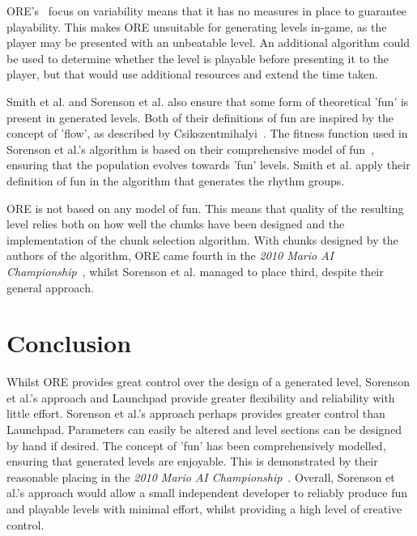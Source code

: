 \documentclass{scrartcl}
\begin{document}
ORE's~\cite{mawhorter:occupancy} focus on variability means that it has no measures in place to guarantee playability. This makes ORE unsuitable for generating levels in-game, as the player may be presented with an unbeatable level. An additional algorithm could be used to determine whether the level is playable before presenting it to the player, but that would use additional resources and extend the time taken.

Smith et al. and Sorenson et al. also ensure that some form of theoretical 'fun' is present in generated levels. Both of their definitions of fun are inspired by the concept of 'flow', as described by Csikszentmihalyi~\cite{csik:flow, smith:rhythm}. The fitness function used in Sorenson et al.'s algorithm is based on their comprehensive model of fun~\cite{sorenson:fun}, ensuring that the population evolves towards 'fun' levels. Smith et al. apply their definition of fun in the algorithm that generates the rhythm groups.

ORE is not based on any model of fun. This means that quality of the resulting level relies both on how well the chunks have been designed and the implementation of the chunk selection algorithm. With chunks designed by the authors of the algorithm, ORE came fourth in the \textit{2010 Mario AI Championship}~\cite{shaker:mario}, whilst Sorenson et al. managed to place third, despite their general approach.


\section{Conclusion}
Whilst ORE provides great control over the design of a generated level, Sorenson et al.'s approach and Launchpad provide greater flexibility and reliability with little effort. Sorenson et al.'s approach perhaps provides greater control than Launchpad. Parameters can easily be altered and level sections can be designed by hand if desired. The concept of 'fun' has been comprehensively modelled, ensuring that generated levels are enjoyable. This is demonstrated by their reasonable placing in the \textit{2010 Mario AI Championship}~\cite{shaker:mario}. Overall, Sorenson et al.'s approach would allow a small independent developer to reliably produce fun and playable levels with minimal effort, whilst providing a high level of creative control.




\end{document}
